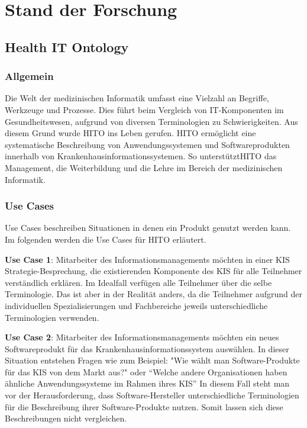 \chapter{Stand der Forschung}\label{ch:relatedWork}

\section{Health IT Ontology}

\subsection{Allgemein}

Die Welt der medizinischen Informatik umfasst eine Vielzahl an Begriffe, Werkzeuge und Prozesse. 
Dies führt beim Vergleich von IT-Komponenten im Gesundheitswesen, aufgrund von diversen Terminologien zu Schwierigkeiten. 
Aus diesem Grund wurde \ac{HITO} ins Leben gerufen.
\ac{HITO} ermöglicht eine systematische Beschreibung von Anwendungssystemen und Softwareprodukten innerhalb von Krankenhausinformationssystemen.
So unterstützt\ac{HITO} das Management, die Weiterbildung und die Lehre im Bereich der medizinischen Informatik.

\subsection{Use Cases}

Use Cases beschreiben Situationen in denen ein Produkt genutzt werden kann.
Im folgenden werden die Use Cases für HITO erläutert. \newline

\textbf{Use Case 1}: Mitarbeiter des Informationsmanagements möchten in einer \ac{KIS} Strategie-Besprechung, die existierenden Komponente des \ac{KIS} für alle Teilnehmer verständlich erklären.
Im Idealfall verfügen alle Teilnehmer über die selbe Terminologie.
Das ist aber in der Realität anders, da die Teilnehmer aufgrund der individuellen Spezialisierungen und Fachbereiche jeweils unterschiedliche Terminologien verwenden. \newline

\textbf{Use Case 2}:  Mitarbeiter des Informationsmanagements möchten ein neues Softwareprodukt für das Krankenhausinformationssystem auswählen.
In dieser Situation entstehen Fragen wie zum Beispiel: "Wie wählt man Software-Produkte für das \ac{KIS} von dem Markt aus?" oder \enquote{Welche andere Organisationen haben ähnliche Anwendungssysteme im Rahmen ihres \ac{KIS}}
In diesem Fall steht man vor der Herausforderung, dass Software-Hersteller unterschiedliche Terminologien für die Beschreibung ihrer Software-Produkte nutzen.
Somit lassen sich diese Beschreibungen nicht vergleichen. \newline

